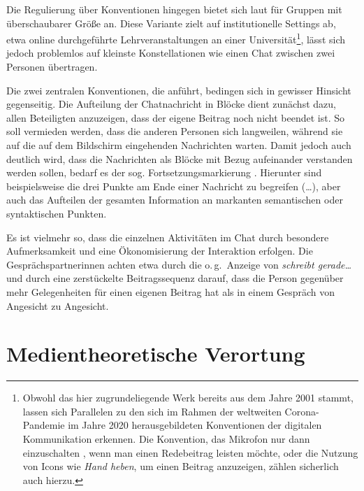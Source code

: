 Die Regulierung über Konventionen hingegen bietet sich laut \citet[14]{storrer_sprachliche_2001} für \glqq Gruppen mit überschaubarer Größe\grqq{} an. Diese Variante zielt auf institutionelle Settings ab, etwa online durchgeführte Lehrveranstaltungen an einer Universität\footnote{Obwohl das hier zugrundeliegende Werk bereits aus dem Jahre 2001 \citep[]{storrer_sprachliche_2001} stammt, lassen sich Parallelen zu den sich im Rahmen der weltweiten Corona-Pandemie im Jahre 2020 herausgebildeten Konventionen der digitalen Kommunikation erkennen. Die Konvention, das Mikrofon nur dann einzuschalten , wenn man einen Redebeitrag leisten möchte, oder die Nutzung von Icons wie \emph{Hand heben}, um einen Beitrag anzuzeigen, zählen sicherlich auch hierzu.}, lässt sich jedoch problemlos auf kleinste Konstellationen wie einen Chat zwischen zwei Personen übertragen. 

Die zwei zentralen Konventionen, die \citeauthor{storrer_sprachliche_2001} anführt, bedingen sich in gewisser Hinsicht gegenseitig. Die Aufteilung der Chatnachricht in Blöcke dient zunächst dazu, allen Beteiligten anzuzeigen, dass der eigene Beitrag noch nicht beendet ist. So soll vermieden werden, dass die anderen Personen sich langweilen, während sie auf die auf dem Bildschirm eingehenden Nachrichten warten. Damit jedoch auch deutlich wird, dass die Nachrichten als Blöcke mit Bezug aufeinander verstanden werden sollen, bedarf es der sog. \glqq Fortsetzungsmarkierung\grqq{} \citep[15]{storrer_sprachliche_2001}. Hierunter sind beispielsweise die drei Punkte am Ende einer Nachricht zu begreifen (\ldots), aber auch das Aufteilen der gesamten Information an markanten semantischen oder syntaktischen Punkten.

Es ist vielmehr so, dass die einzelnen Aktivitäten im Chat durch besondere Aufmerksamkeit und eine Ökonomisierung der Interaktion erfolgen. Die Gesprächspartner{\textperiodcentered}innen achten etwa durch die o.\,g.\ Anzeige von \emph{schreibt gerade\dots} und durch eine zerstückelte Beitragssequenz darauf, dass die Person gegenüber mehr Gelegenheiten für einen eigenen Beitrag hat als in einem Gespräch von Angesicht zu Angesicht. 



%

\section{Medientheoretische Verortung}
\label{K2:sec:medientheoretische-verortung}

